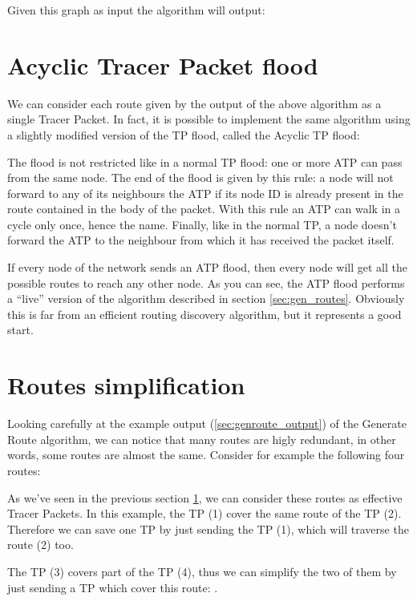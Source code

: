 \documentclass[a4paper]{article}
\begin{document}
Given this graph as input the algorithm will output:
\label{sec:genroute_output}


\section{Acyclic Tracer Packet flood}
\label{sec:acyclic_TP_flood}

We can consider each route given by the output of the above algorithm as a
single Tracer Packet.
In fact, it is possible to implement the same algorithm using a slightly
modified version of the TP flood, called the Acyclic TP flood:

The flood is not restricted like in a normal TP flood: one or more ATP can
pass from the same node. The end of the flood is given by this rule: a node
will not forward to any of its neighbours the ATP if its node ID is already present
in the route contained in the body of the packet. With this rule an ATP can
walk in a cycle only once, hence the name.
Finally, like in the normal TP, a node doesn't forward the ATP to the
neighbour from which it has received the packet itself.

If every node of the network sends an ATP flood, then every node will get
all the possible routes to reach any other node.
\newline
As you can see, the ATP flood performs a ``live'' version of the algorithm
described in section \ref{sec:gen_routes}.
Obviously this is far from an efficient routing discovery algorithm, but it
represents a good start.

\section{Routes simplification}
\label{sec:simplify_routes}

Looking carefully at the example output (\ref{sec:genroute_output}) of the
Generate Route algorithm, we can notice that many routes are higly redundant,
in other words, some routes are almost the same.
Consider for example the following four routes:


As we've seen in the previous section \ref{sec:acyclic_TP_flood}, we can consider
these routes as effective Tracer Packets.
In this example, the TP (1) cover the same route of the TP
(2). Therefore we can save one TP by just sending the TP
(1), which will traverse the route (2) too.

The TP (3) covers part of the TP (4), thus we can simplify
the two of them by just sending a TP which cover this route: .
\end{document}
